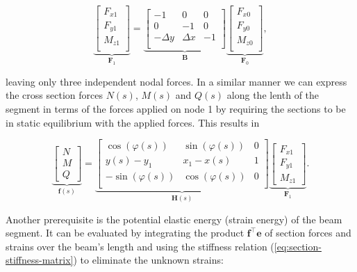 \begin{equation}
\underbrace{
\begin{bmatrix}
F_{x1} \\
F_{y1} \\
M_{z1} \\
\end{bmatrix}
}_{\boldsymbol{F}_1}
=
\underbrace{
\begin{bmatrix}
-1 & 0 & 0 \\
0 & -1 & 0 \\
-\Delta y & \Delta x & -1 \\
\end{bmatrix}
}_{\boldsymbol{B}}
\underbrace{
\begin{bmatrix}
F_{x0} \\
F_{y0} \\
M_{z0} \\
\end{bmatrix}
}_{\boldsymbol{F}_0}, \label{eq:segment-static-equilibrium}
\end{equation}

leaving only three independent nodal forces.
In a similar manner we can express the cross section forces $N(s)$, $M(s)$ and $Q(s)$ along the lenth of the segment in terms of the forces applied on node 1 by requiring the sections to be in static equilibrium with the applied forces.
This results in

\begin{equation}
\underbrace{
\begin{bmatrix}
N \\ M \\ Q
\end{bmatrix}
}_{\boldsymbol{f}(s)}
=
\underbrace{
\begin{bmatrix}
\cos(\varphi(s)) & \sin(\varphi(s)) & 0 \\
y(s) - y_1 & x_1 - x(s) & 1 \\
-\sin(\varphi(s)) & \cos(\varphi(s)) & 0 \\
\end{bmatrix}
}_{\boldsymbol{H}(s)}
\underbrace{
\begin{bmatrix}
F_{x1} \\ F_{y1} \\ M_{z1}
\end{bmatrix}
}_{\boldsymbol{F}_1}. \label{eq:section-static-equilibrium}
\end{equation}

Another prerequisite is the potential elastic energy (strain energy) of the beam segment.
It can be evaluated by integrating the product $\boldsymbol{f}^\intercal\boldsymbol{e}$ of section forces and strains over the beam's length and using the stiffness relation (\ref{eq:section-stiffness-matrix}) to eliminate the unknown strains:

